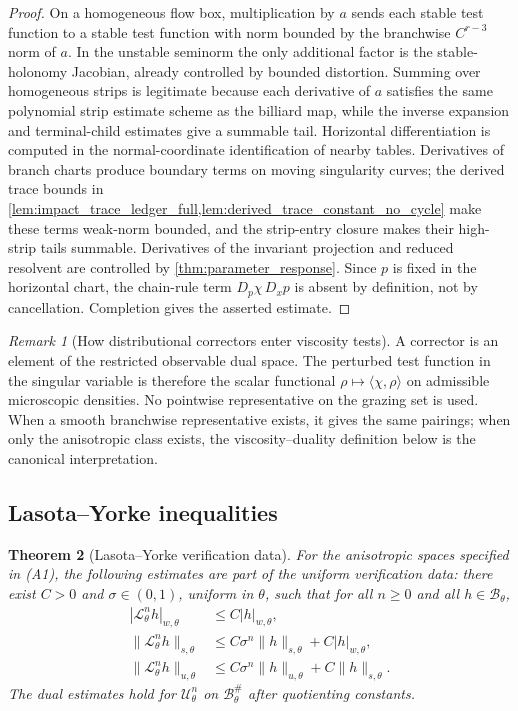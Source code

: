 \documentclass[12pt, letterpaper]{amsart}
\newcommand{\Bcal}{\mathcal{B}}
\theoremstyle{plain}
\newtheorem{theorem}{Theorem}[section]
\theoremstyle{definition}
\theoremstyle{remark}
\newtheorem{remark}[theorem]{Remark}
\begin{document}
\begin{proof}
On a homogeneous flow box, multiplication by $a$ sends each stable test function
to a stable test function with norm bounded by the branchwise $C^{r-3}$ norm of
$a$.  In the unstable seminorm the only additional factor is the stable-holonomy
Jacobian, already controlled by bounded distortion.  Summing over homogeneous
strips is legitimate because each derivative of $a$ satisfies the same
polynomial strip estimate scheme as the billiard map, while the inverse expansion and
terminal-child estimates give a summable tail.  Horizontal differentiation is
computed in the normal-coordinate identification of nearby tables.  Derivatives
of branch charts produce boundary terms on moving singularity curves; the
derived trace bounds in \cref{lem:impact_trace_ledger_full,lem:derived_trace_constant_no_cycle} make these
terms weak-norm bounded, and the strip-entry closure makes their high-strip tails
summable.  Derivatives of the invariant projection and reduced resolvent are
controlled by \cref{thm:parameter_response}.  Since $p$ is fixed in the
horizontal chart, the chain-rule term $D_p\chi\,D_xp$ is absent by definition,
not by cancellation.  Completion gives the asserted estimate.
\end{proof}

\begin{remark}[How distributional correctors enter viscosity tests]
A corrector is an element of the restricted observable dual space.  The
perturbed test function in the singular variable is therefore the scalar
functional $\rho\mapsto\langle\chi,\rho\rangle$ on admissible microscopic
densities.  No pointwise representative on the grazing set is used.  When a
smooth branchwise representative exists, it gives the same pairings; when only
the anisotropic class exists, the viscosity--duality definition below is the
canonical interpretation.
\end{remark}

\subsection{Lasota--Yorke inequalities}


\begin{theorem}[Lasota--Yorke verification data]
\label{thm:LY}
For the anisotropic spaces specified in \textup{(A1)}, the following estimates
are part of the uniform verification data: there exist $C>0$ and
$\sigma\in(0,1)$, uniform in $\theta$, such that
for all $n\ge0$ and all $h\in\Bcal_\theta$,
\begin{align}
    |\mathscr{L}_\theta^n h|_{w,\theta}&\le C|h|_{w,\theta},\\
    \|\mathscr{L}_\theta^n h\|_{s,\theta}&\le C\sigma^n\|h\|_{s,\theta}+C|h|_{w,\theta},\\
    \|\mathscr{L}_\theta^n h\|_{u,\theta}&\le C\sigma^n\|h\|_{u,\theta}+C\|h\|_{s,\theta}.
\end{align}
The dual estimates hold for $\mathscr{U}_\theta^n$ on $\Bcal_\theta^{\#}$ after
quotienting constants.
\end{theorem}
\end{document}
